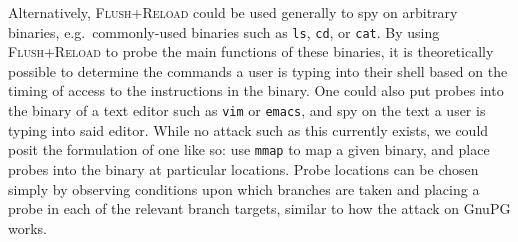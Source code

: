 \documentclass[11pt]{llncs}
\newcommand{\flushreload}{\textsc{Flush}+\textsc{Reload}}
\begin{document}
Alternatively, \flushreload{} could be used generally to spy on arbitrary
binaries, e.g.\ commonly-used binaries such as \texttt{ls}, \texttt{cd}, or
\texttt{cat}. By using \flushreload{} to probe the main functions of these
binaries, it is theoretically possible to determine the commands a user is
typing into their shell based on the timing of access to the instructions in the
binary. One could also put probes into the binary of a text editor such as
\texttt{vim} or \texttt{emacs}, and spy on the text a user is typing into said
editor. While no attack such as this currently exists, we could posit the
formulation of one like so: use \texttt{mmap} to map a given binary, and place
probes into the binary at particular locations. Probe locations can be chosen
simply by observing conditions upon which branches are taken and placing a probe
in each of the relevant branch targets, similar to how the attack on GnuPG
works.

\lobsectionbreak




\hspace*{7cm}
 \hfill
\end{document}

